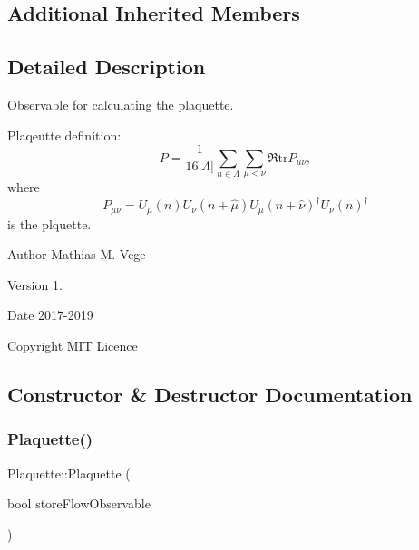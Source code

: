\subsection*{Additional Inherited Members}


\subsection{Detailed Description}
Observable for calculating the plaquette. 

Plaqeutte definition\+: \[ P = \frac{1}{16|\Lambda|} \sum_{n\in\Lambda} \sum_{\mu < \nu} \Re \mathrm{tr} P_{\mu\nu}, \] where \[ P_{\mu\nu}=U_\mu(n) U_{\nu}(n+\hat{\mu}) U_{\mu}(n+\hat{\nu})^\dagger U_{\nu} (n)^\dagger \] is the plquette.

\begin{DoxyAuthor}{Author}
Mathias M. Vege 
\end{DoxyAuthor}
\begin{DoxyVersion}{Version}
1. 
\end{DoxyVersion}
\begin{DoxyDate}{Date}
2017-\/2019 
\end{DoxyDate}
\begin{DoxyCopyright}{Copyright}
M\+IT Licence 
\end{DoxyCopyright}


\subsection{Constructor \& Destructor Documentation}
\mbox{\label{class_plaquette_a1c87b43fc7ee74b2b0289de63e03bb61}} 
\subsubsection{\texorpdfstring{Plaquette()}{Plaquette()}}
{\footnotesize\ttfamily Plaquette\+::\+Plaquette (\begin{DoxyParamCaption}\item[{bool}]{store\+Flow\+Observable }\end{DoxyParamCaption})}

